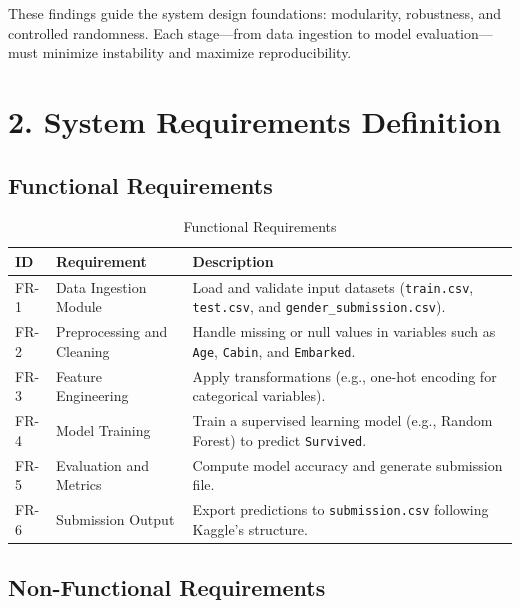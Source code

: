 \documentclass[12pt]{report}
\begin{document}
These findings guide the system design foundations: modularity, robustness, and controlled randomness. Each stage—from data ingestion to model evaluation—must minimize instability and maximize reproducibility.


\section*{2. System Requirements Definition}

\subsection*{Functional Requirements}

\begin{table}[H]
\centering
\begin{tabular}{|p{1cm}|p{4cm}|p{9cm}|}
\hline
\textbf{ID} & \textbf{Requirement} & \textbf{Description} \\ \hline
FR-1 & Data Ingestion Module & Load and validate input datasets (\texttt{train.csv}, \texttt{test.csv}, and \texttt{gender\_submission.csv}). \\ \hline
FR-2 & Preprocessing and Cleaning & Handle missing or null values in variables such as \texttt{Age}, \texttt{Cabin}, and \texttt{Embarked}. \\ \hline
FR-3 & Feature Engineering & Apply transformations (e.g., one-hot encoding for categorical variables). \\ \hline
FR-4 & Model Training & Train a supervised learning model (e.g., Random Forest) to predict \texttt{Survived}. \\ \hline
FR-5 & Evaluation and Metrics & Compute model accuracy and generate submission file. \\ \hline
FR-6 & Submission Output & Export predictions to \texttt{submission.csv} following Kaggle’s structure. \\ \hline
\end{tabular}
\caption{Functional Requirements}
\end{table}

\subsection*{Non-Functional Requirements}
\end{document}
